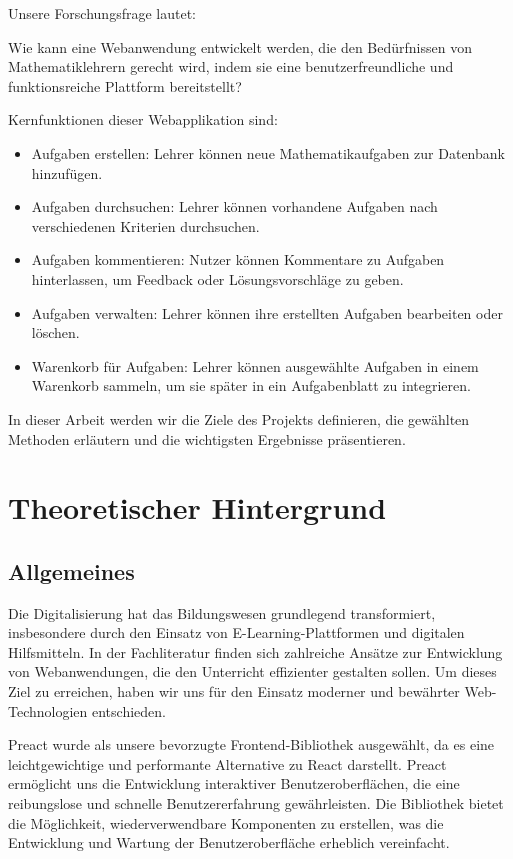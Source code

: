 \documentclass[12pt,a4paper]{article} %
\begin{document}
Unsere Forschungsfrage lautet: 

Wie kann eine Webanwendung entwickelt werden, die den Bedürfnissen von Mathematiklehrern gerecht wird, indem sie eine benutzerfreundliche und funktionsreiche Plattform bereitstellt?

Kernfunktionen dieser Webapplikation sind:
\begin{itemize}



\item Aufgaben erstellen: Lehrer können neue Mathematikaufgaben zur Datenbank
hinzufügen.

\item Aufgaben durchsuchen: Lehrer können vorhandene Aufgaben nach verschiedenen Kriterien durchsuchen.

\item Aufgaben kommentieren: Nutzer können Kommentare zu Aufgaben hinterlassen, um Feedback oder Lösungsvorschläge zu geben.

\item Aufgaben verwalten: Lehrer können ihre erstellten Aufgaben bearbeiten oder löschen.

\item Warenkorb für Aufgaben: Lehrer können ausgewählte Aufgaben in einem Warenkorb sammeln, um sie später in ein Aufgabenblatt zu integrieren.
\end{itemize}

In dieser Arbeit werden wir die Ziele des Projekts definieren, die gewählten Methoden erläutern und die wichtigsten Ergebnisse präsentieren. 


\section{Theoretischer Hintergrund}
\subsection{Allgemeines}
Die Digitalisierung hat das Bildungswesen grundlegend transformiert, insbesondere durch den Einsatz von E-Learning-Plattformen und digitalen Hilfsmitteln. In der Fachliteratur finden sich zahlreiche Ansätze zur Entwicklung von Webanwendungen, die den Unterricht effizienter gestalten sollen. Um dieses Ziel zu erreichen, haben wir uns für den Einsatz moderner und bewährter Web-Technologien entschieden.

Preact wurde als unsere bevorzugte Frontend-Bibliothek ausgewählt, da es eine leichtgewichtige und performante Alternative zu React darstellt. Preact ermöglicht uns die Entwicklung interaktiver Benutzeroberflächen, die eine reibungslose und schnelle Benutzererfahrung gewährleisten. Die Bibliothek bietet die Möglichkeit, wiederverwendbare Komponenten zu erstellen, was die Entwicklung und Wartung der Benutzeroberfläche erheblich vereinfacht.
\end{document}

